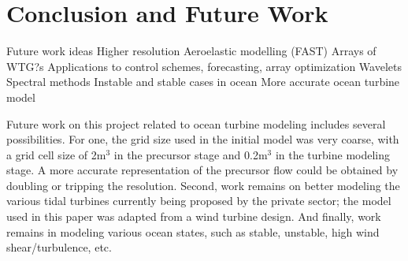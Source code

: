 \section{Conclusion and Future Work}

Future work ideas
Higher resolution
Aeroelastic modelling (FAST)
Arrays of WTG?s
Applications to control schemes, forecasting, array optimization
Wavelets
Spectral methods
Instable and stable cases in ocean
More accurate ocean turbine model

Future work on this project related to ocean turbine modeling includes several possibilities. For one, the grid size used in the initial model was very coarse, with a grid cell size of 2m$^3$ in the precursor stage and 0.2m$^3$ in the turbine modeling stage. A more accurate representation of the precursor flow could be obtained by doubling or tripping the resolution. Second, work remains on better modeling the various tidal turbines currently being proposed by the private sector; the model used in this paper was adapted from a wind turbine design. And finally, work remains in modeling various ocean states, such as stable, unstable, high wind shear/turbulence, etc.



